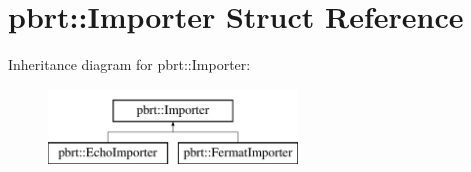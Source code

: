 \hypertarget{structpbrt_1_1_importer}{}\section{pbrt\+:\+:Importer Struct Reference}
\label{structpbrt_1_1_importer}
Inheritance diagram for pbrt\+:\+:Importer\+:\begin{figure}[H]
\begin{center}
\leavevmode
\includegraphics[height=2.000000cm]{structpbrt_1_1_importer}
\end{center}
\end{figure}
